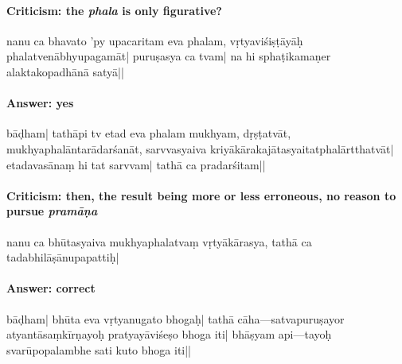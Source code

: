 \paragraph{Criticism: the \emph{phala} is only figurative?}
nanu ca bhavato ’py upacaritam eva phalam, vṛtyaviśiṣṭāyāḥ 
phalatvenābhyupagamāt| puruṣasya ca %
tvam| na hi sphaṭikamaṇer %
a\mde laktakopadhānā satyā||

\paragraph{Answer: yes}
bāḍham| tathāpi tv etad eva %
phalam mukhyam, dṛṣṭatvāt, mukhyaphalāntarādarśanāt, sarvvasyaiva kriyākārakajātasyaitatpha\-lārtthatvāt| etadavasānaṃ hi tat sarvvam| 
tathā ca pradarśitam||

\paragraph{Criticism: then, the result being more or less erroneous, no reason to pursue \emph{pramāṇa}}
nanu ca bhūtasyaiva mukhyaphalatvaṃ vṛtyāk\mde ārasya, 
tathā ca tadabhilāṣānupapattiḥ| 

\paragraph{Answer: correct}
bāḍham| bhūta %
\mds eva vṛtyanugato bhogaḥ| tathā cāha---satvapuruṣayo\mde r atyantāsaṃkīrṇa\mds yoḥ pratyayāviśeṣo bhoga %
 iti| bhā\-ṣyam api---tayoḥ svarūpopalambhe sati kuto bhoga iti|| 

